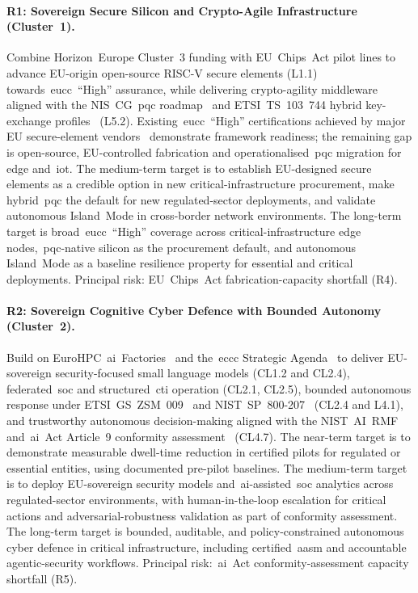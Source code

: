 \documentclass{ieeeaccess}
\begin{document}
\paragraph{R1: Sovereign Secure Silicon and Crypto-Agile Infrastructure (Cluster~1).}
Combine Horizon~Europe Cluster~3 funding with EU~Chips~Act pilot lines to advance EU-origin open-source RISC-V secure elements (L1.1) towards~\gls{eucc}~``High'' assurance, while delivering crypto-agility middleware aligned with the NIS~CG~\gls{pqc} roadmap~\cite{niscg2025pqc} and ETSI~TS~103~744 hybrid key-exchange profiles~\cite{etsiqshybrid} (L5.2). Existing~\gls{eucc}~``High'' certifications achieved by major EU secure-element vendors~\cite{enisaeucc2025} demonstrate framework readiness; the remaining gap is open-source, EU-controlled fabrication and operationalised~\gls{pqc} migration for edge and~\gls{iot}. The medium-term target is to establish EU-designed secure elements as a credible option in new critical-infrastructure procurement, make hybrid~\gls{pqc} the default for new regulated-sector deployments, and validate autonomous Island~Mode in cross-border network environments. The long-term target is broad~\gls{eucc}~``High'' coverage across critical-infrastructure edge nodes,~\gls{pqc}-native silicon as the procurement default, and autonomous Island~Mode as a baseline resilience property for essential and critical deployments. Principal risk: EU~Chips~Act fabrication-capacity shortfall (R4).

\paragraph{R2: Sovereign Cognitive Cyber Defence with Bounded Autonomy (Cluster~2).}
Build on EuroHPC~\gls{ai}~Factories~\cite{eurohpcaifactories} and the~\gls{eccc} Strategic Agenda~\cite{eccc2024} to deliver EU-sovereign security-focused small language models (CL1.2 and CL2.4), federated~\gls{soc} and structured~\gls{cti} operation (CL2.1, CL2.5), bounded autonomous response under ETSI~GS~ZSM~009~\cite{etsizsm} and NIST~SP~800-207~\cite{rose2020zta} (CL2.4 and L4.1), and trustworthy autonomous decision-making aligned with the NIST~AI~RMF~\cite{nistairmf,nistaigenai} and~\gls{ai}~Act Article~9 conformity assessment~\cite{euaiact} (CL4.7). The near-term target is to demonstrate measurable dwell-time reduction in certified pilots for regulated or essential entities, using documented pre-pilot baselines. The medium-term target is to deploy EU-sovereign security models and~\gls{ai}-assisted~\gls{soc} analytics across regulated-sector environments, with human-in-the-loop escalation for critical actions and adversarial-robustness validation as part of conformity assessment. The long-term target is bounded, auditable, and policy-constrained autonomous cyber defence in critical infrastructure, including certified~\gls{aasm} and accountable agentic-security workflows. Principal risk:~\gls{ai}~Act conformity-assessment capacity shortfall (R5).
\end{document}
